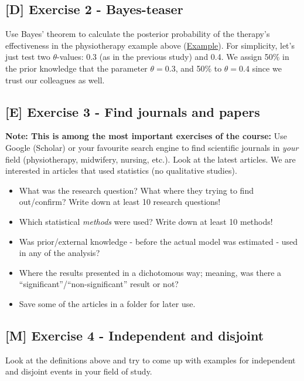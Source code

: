 \documentclass[
]{book}
\providecommand{\tightlist}{%
  \setlength{\itemsep}{0pt}\setlength{\parskip}{0pt}}
\begin{document}
\subsection{{[}D{]} Exercise 2 - Bayes-teaser}\label{exercise2}

Use Bayes' theorem to calculate the posterior probability of the therapy's effectiveness in the physiotherapy example above (\hyperref[example1_physio]{Example}).
For simplicity, let's just test two \(\theta\)-values: 0.3 (as in the previous study) and 0.4. We assign 50\% in the prior knowledge that the parameter
\(\theta=0.3\), and 50\% to \(\theta=0.4\) since we trust our colleagues as well.

\subsection{{[}E{]} Exercise 3 - Find journals and papers}\label{exercise3}

\textbf{Note: This is among the most important exercises of the course:}
Use Google (Scholar) or your favourite search engine to find scientific journals in \emph{your} field (physiotherapy,
midwifery, nursing, etc.).
Look at the latest articles. We are interested in articles that used statistics (no qualitative studies).

\begin{itemize}
\tightlist
\item
  What was the research question? What where they trying to find out/confirm? Write down at least 10 research questions!
\item
  Which statistical \emph{methods} were used? Write down at least 10 methods!
\item
  Was prior/external knowledge - before the actual model was estimated - used in any of the analysis?
\item
  Where the results presented in a dichotomous way; meaning, was there a ``significant''/``non-significant'' result or not?
\item
  Save some of the articles in a folder for later use.
\end{itemize}

\subsection{{[}M{]} Exercise 4 - Independent and disjoint}\label{exercise4}

Look at the definitions above and try to come up with examples for independent and disjoint events in your field of study.
\end{document}
